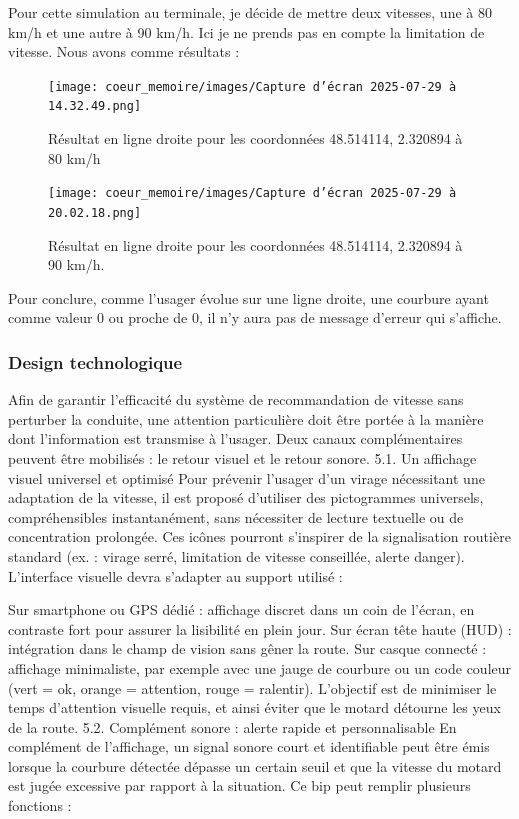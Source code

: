 Pour cette simulation au terminale, je décide de mettre deux vitesses, une à 80 km/h et une autre à 90 km/h. Ici je ne prends pas en compte la limitation de vitesse. Nous avons comme résultats :
\begin{figure}[H]
    \centering
    \texttt{[image: coeur\_memoire/images/Capture d’écran 2025-07-29 à 14.32.49.png]} 
    \caption{Résultat en ligne droite pour les coordonnées 48.514114, 2.320894 à 80 km/h}
\end{figure}
\begin{figure}[H]
    \centering
    \texttt{[image: coeur\_memoire/images/Capture d’écran 2025-07-29 à 20.02.18.png]} 
    \caption{Résultat en ligne droite pour les coordonnées 48.514114, 2.320894 à 90 km/h.}
\end{figure}
Pour conclure, comme l'usager évolue sur une ligne droite, une courbure ayant comme valeur 0 ou proche de 0, il n'y aura pas de message d'erreur qui s'affiche.

\subsubsection{Design technologique}
Afin de garantir l’efficacité du système de recommandation de vitesse sans perturber la conduite, une attention particulière doit être portée à la manière dont l’information est transmise à l’usager. Deux canaux complémentaires peuvent être mobilisés : le retour visuel et le retour sonore.
5.1. Un affichage visuel universel et optimisé
Pour prévenir l’usager d’un virage nécessitant une adaptation de la vitesse, il est proposé d’utiliser des pictogrammes universels, compréhensibles instantanément, sans nécessiter de lecture textuelle ou de concentration prolongée. Ces icônes pourront s’inspirer de la signalisation routière standard (ex. : virage serré, limitation de vitesse conseillée, alerte danger).
L’interface visuelle devra s’adapter au support utilisé :

Sur smartphone ou GPS dédié : affichage discret dans un coin de l’écran, en contraste fort pour assurer la lisibilité en plein jour.
Sur écran tête haute (HUD) : intégration dans le champ de vision sans gêner la route.
Sur casque connecté : affichage minimaliste, par exemple avec une jauge de courbure ou un code couleur (vert = ok, orange = attention, rouge = ralentir).
L'objectif est de minimiser le temps d’attention visuelle requis, et ainsi éviter que le motard détourne les yeux de la route.
5.2. Complément sonore : alerte rapide et personnalisable
En complément de l’affichage, un signal sonore court et identifiable peut être émis lorsque la courbure détectée dépasse un certain seuil et que la vitesse du motard est jugée excessive par rapport à la situation.
Ce bip peut remplir plusieurs fonctions :

